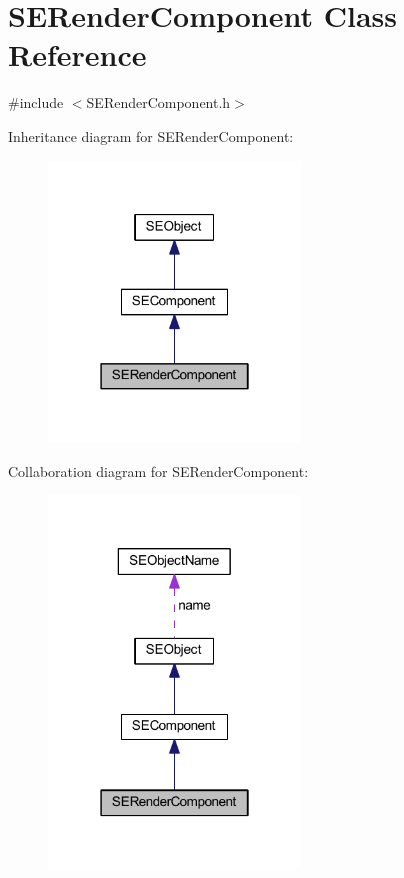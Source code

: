 \section{S\+E\+Render\+Component Class Reference}
\label{class_s_e_render_component}


{\ttfamily \#include $<$S\+E\+Render\+Component.\+h$>$}



Inheritance diagram for S\+E\+Render\+Component\+:
\nopagebreak
\begin{figure}[H]
\begin{center}
\leavevmode
\includegraphics[width=190pt]{class_s_e_render_component__inherit__graph}
\end{center}
\end{figure}


Collaboration diagram for S\+E\+Render\+Component\+:
\nopagebreak
\begin{figure}[H]
\begin{center}
\leavevmode
\includegraphics[width=190pt]{class_s_e_render_component__coll__graph}
\end{center}
\end{figure}
